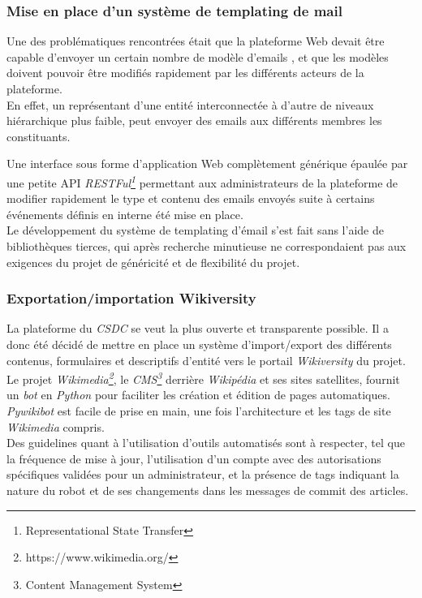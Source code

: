 \documentclass[french, 11pt]{memoir}
\begin{document}
\subsubsection{Mise en place d'un système de templating de
mail}\label{mise-en-place-dun-systuxe8me-de-templating-de-mail}

Une des problématiques rencontrées était que la plateforme Web devait
être capable d'envoyer un certain nombre de modèle d'emails , et que les
modèles doivent pouvoir être modifiés rapidement par les différents
acteurs de la plateforme. \\
En effet, un représentant d'une entité interconnectée à d'autre de
niveaux hiérarchique plus faible, peut envoyer des emails aux différents
membres les constituants.

\bigskip
Une interface sous forme d'application Web complètement générique
épaulée par une petite API \emph{RESTFul\footnote{Representational State Transfer}} permettant aux administrateurs
de la plateforme de modifier rapidement le type et contenu des emails
envoyés suite à certains événements définis en interne été mise en
place. \\
Le développement du système de templating d'émail s'est fait sans l'aide
de bibliothèques tierces, qui après recherche minutieuse ne
correspondaient pas aux exigences du projet de généricité et de
flexibilité du projet.

\subsubsection{Exportation/importation
Wikiversity}\label{exportationimportation-wikiversity}

La plateforme du \emph{CSDC} se veut la plus ouverte et transparente
possible. Il a donc été décidé de mettre en place un système
d'import/export des différents contenus, formulaires et descriptifs
d'entité vers le portail \emph{Wikiversity} du projet. Le projet
\textit{Wikimedia\footnote{https://www.wikimedia.org/}}, le \textit{CMS\footnote{Content Management System}} derrière \emph{Wikipédia} et ses sites
satellites, fournit un \emph{bot} en \emph{Python} pour faciliter les
création et édition de pages automatiques. \emph{Pywikibot} est facile
de prise en main, une fois l'architecture et les tags de site
\emph{Wikimedia} compris. \\
Des guidelines quant à l'utilisation d'outils
automatisés sont à respecter, tel que la fréquence de mise à jour,
l'utilisation d'un compte avec des autorisations spécifiques validées
pour un administrateur, et la présence de tags indiquant la nature du
robot et de ses changements dans les messages de commit des articles.
\end{document}
